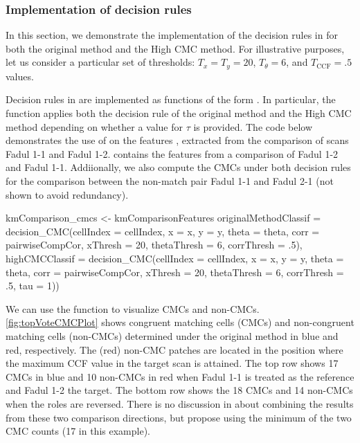 \hypertarget{decisionRuleImplementation}{%
\subsubsection{Implementation of decision
rules}\label{decisionRuleImplementation}}

In this section, we demonstrate the implementation of the decision rules
in  for both the original method and the High CMC method.
For illustrative purposes, let us consider a particular set of
thresholds: \(T_x = T_y = 20\), \(T_{\theta} = 6\), and
\(T_{\text{CCF}} = .5\) values.

Decision rules in  are implemented as functions of the
form . In particular, the 
function applies both the decision rule of the original method and the
High CMC method depending on whether a value for \(\tau\) is provided.
The code below demonstrates the use of  on the
features , extracted from the comparison of
scans Fadul 1-1 and Fadul 1-2.  contains
the features from a comparison of Fadul 1-2 and Fadul 1-1. Addiionally,
we also compute the CMCs under both decision rules for the comparison
between the non-match pair Fadul 1-1 and Fadul 2-1 (not shown to avoid
redundancy).

\begin{Schunk}
\begin{Sinput}
kmComparison_cmcs <- kmComparisonFeatures %
  originalMethodClassif = 
    decision_CMC(cellIndex = cellIndex, x = x, y = y, theta = theta,
                 corr = pairwiseCompCor, xThresh = 20, thetaThresh = 6,
                 corrThresh = .5),
  highCMCClassif = 
    decision_CMC(cellIndex = cellIndex, x = x, y = y, theta = theta,
                 corr = pairwiseCompCor, xThresh = 20, thetaThresh = 6,
                 corrThresh = .5, tau = 1))
\end{Sinput}
\end{Schunk}

We can use the  function to visualize CMCs and non-CMCs.
\autoref{fig:topVoteCMCPlot} shows congruent matching cells (CMCs) and
non-congruent matching cells (non-CMCs) determined under the original
method in blue and red, respectively. The (red) non-CMC patches are
located in the position where the maximum CCF value in the target scan
is attained. The top row shows 17 CMCs in blue and 10 non-CMCs in red
when Fadul 1-1 is treated as the reference and Fadul 1-2 the target. The
bottom row shows the 18 CMCs and 14 non-CMCs when the roles are
reversed. There is no discussion in \citet{song_proposed_2013} about
combining the results from these two comparison directions, but
\citet{tong_improved_2015} propose using the minimum of the two CMC
counts (17 in this example).

